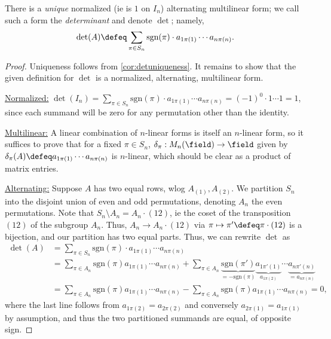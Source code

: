 \begin{theorem}\label{thm:determinant}
    There is a \emph{unique} normalized (ie is $1$ on $I_n$) alternating multilinear form; we call such a form the \emph{determinant} and denote $\det$; namely, \[
    \det(A)\defeq \sum_{\pi \in S_n}  \text{sgn}(\pi) \cdot a_{1 \pi(1)} \cdots a_{n \pi(n)}.
    \]
\end{theorem}
\begin{proof}
    Uniqueness follows from \cref{cor:detuniqueness}. It remains to show that the given definition for $\det$ is a normalized, alternating, multilinear form.
    
    \underline{Normalized:} $\det(I_n) = \sum_{ \pi \in S_n} \text{sgn}(\pi) \cdot a_{1 \pi(1)} \cdots a_{n \pi(n)} =(-1)^0 \cdot  1 \cdots 1 = 1$, since each summand will be zero for any permutation other than the identity.

    \underline{Multilinear:} A linear combination of $n$-linear forms is itself an $n$-linear form, so it suffices to prove that for a fixed $\pi \in S_n$, $\delta_\pi : M_n(\field) \to \field$ given by $\delta_\pi (A) \defeq a_{1 \pi(1)} \cdots a_{n \pi (n)}$ is $n$-linear, which should be clear as a product of matrix entries.

    \underline{Alternating:} Suppose $A$ has two equal rows, wlog $A_{(1)}, A_{(2)}$. We partition $S_n$ into the disjoint union of even and odd permutations, denoting $A_n$ the even permutations. Note that $S_n \setminus A_n = A_n \cdot (12)$, ie the coset of the transposition $(12)$ of the subgroup $A_n$. Thus, $A_n \to A_n \cdot (12)$ via $\pi \mapsto \pi' \defeq \pi \cdot (12)$ is a bijection, and our partition has two equal parts. Thus, we can rewrite $\det$ as \begin{align*}
        \det(A) &=\sum_{\pi \in S_n}  \text{sgn}(\pi) \cdot a_{1 \pi(1)} \cdots a_{n \pi(n)} \\
        &= \sum_{\pi \in A_n} \text{sgn}(\pi) a_{1 \pi(1)} \cdots a_{n\pi(n)} + \sum_{\pi \in A_n} \underbrace{\text{sgn}(\pi')}_{=- \text{sgn}(\pi)} \underbrace{a_{1 \pi'(1)}}_{a_{1 \pi(2)}}\cdots \underbrace{a_{n\pi'(n)}}_{= a_{n \pi(n)}}\\
        &= \sum_{\pi \in A_n} \text{sgn}(\pi) a_{1 \pi(1)} \cdots a_{n\pi(n)} - \sum_{\pi \in A_n} \text{sgn}(\pi) a_{1 \pi(1)} \cdots a_{n\pi(n)} = 0,
    \end{align*}
    where the last line follows from $a_{1 \pi(2)} = a_{2 \pi(2)}$ and conversely $a_{2 \pi(1)} = a_{1 \pi(1)}$ by assumption, and thus the two partitioned summands are equal, of opposite sign.
\end{proof}

